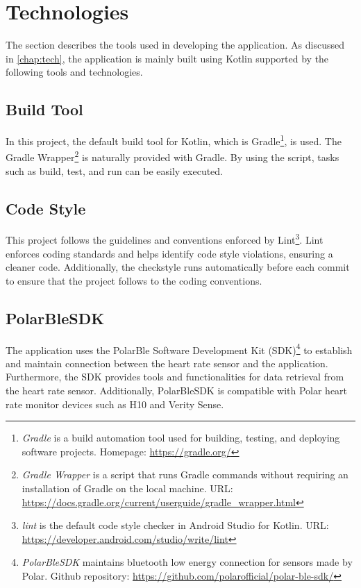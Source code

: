 \section{Technologies}
The section describes the tools used in developing the application. 
As discussed in \autoref{chap:tech}, the application is mainly built using Kotlin supported by the following tools and technologies.

\subsection{Build Tool}
In this project, the default build tool for Kotlin, which is Gradle\footnote{\emph{Gradle} is a build automation tool used for  building, testing, and deploying software projects. Homepage: \url{https://gradle.org/}}, is used.
The Gradle Wrapper\footnote{\emph{Gradle Wrapper} is a script that runs Gradle commands without requiring an installation of Gradle on the local machine. URL: \url{https://docs.gradle.org/current/userguide/gradle_wrapper.html}} is naturally provided with Gradle. 
By using the script, tasks such as build, test, and run can be easily executed.

\subsection{Code Style}
This project follows the guidelines and conventions enforced by Lint\footnote{\emph{lint} is the default code style checker in Android Studio for Kotlin. URL: \url{https://developer.android.com/studio/write/lint}}.
Lint enforces coding standards and helps identify code style violations, ensuring a cleaner code. 
Additionally, the checkstyle runs automatically before each commit to ensure that the project follows to the coding conventions.

\subsection{PolarBleSDK}
\label{chap:polarblesdk}
The application uses the PolarBle Software Development Kit (SDK)\footnote{\emph{PolarBleSDK} maintains bluetooth low energy connection for sensors made by Polar. Github repository: \url{https://github.com/polarofficial/polar-ble-sdk/}} to establish and maintain connection between the heart rate sensor and the application.
Furthermore, the SDK provides tools and functionalities for data retrieval from the heart rate sensor.
Additionally, PolarBleSDK is compatible with Polar heart rate monitor devices such as H10 and Verity Sense.

